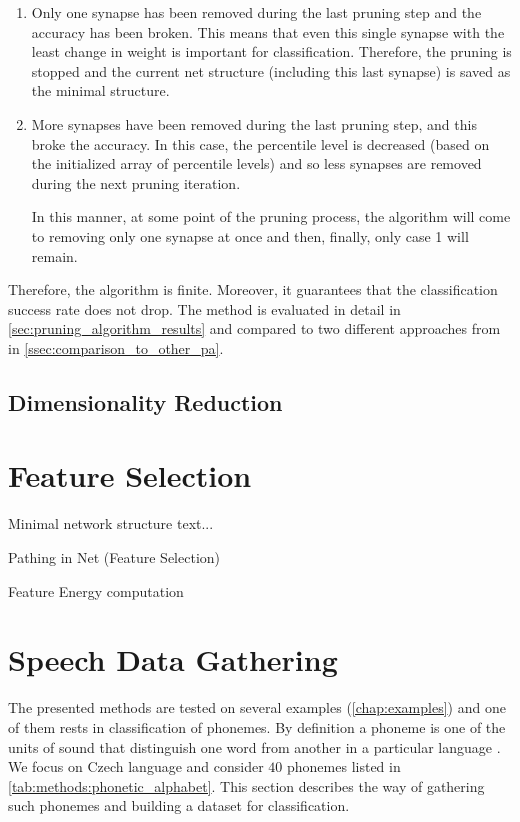 \begin{enumerate}
\item Only one synapse has been removed during the last pruning step and the accuracy has been broken. This means that even this single synapse with the least change in weight is important for classification. Therefore, the pruning is stopped and the current net structure (including this last synapse) is saved as the minimal structure.
\item More synapses have been removed during the last pruning step, and this broke the accuracy. In this case, the percentile level is decreased (based on the initialized array of percentile levels) and so less synapses are removed during the next pruning iteration.

In this manner, at some point of the pruning process, the algorithm will come to removing only one synapse at once and then, finally, only case 1 will remain.
\end{enumerate}

Therefore, the algorithm is finite. Moreover, it guarantees that the classification success rate does not drop. The method is evaluated in detail in \cref{sec:pruning_algorithm_results} and compared to two different approaches from \citep{article:10:pa} in \cref{ssec:comparison_to_other_pa}.

\subsection*{Dimensionality Reduction}

\section{Feature Selection} \label{sec:feature_selection}
Minimal network structure text...

Pathing in Net (Feature Selection)

Feature Energy computation

\newpage
\section{Speech Data Gathering} \label{sec:speech_data_gathering}
The presented methods are tested on several examples (\cref{chap:examples}) and one of them rests in classification of phonemes. By definition a phoneme is one of the units of sound that distinguish one word from another in a particular language \citep{wiki:mnist}. We focus on Czech language and consider $ 40 $ phonemes listed in \cref{tab:methods:phonetic_alphabet}. This section describes the way of gathering such phonemes and building a dataset for classification.


